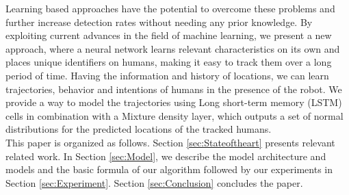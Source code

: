 Learning based approaches have the potential to overcome these problems and further increase detection rates without needing any prior knowledge.
By exploiting current advances in the field of machine learning, we present a new approach, where a neural network learns relevant characteristics on its own and places unique identifiers on humans, making it easy to track them over a long period of time.
Having the information and history of locations, we can learn trajectories, behavior and intentions of humans in the presence of the robot. 
We provide a way to model the trajectories using Long short-term memory (LSTM) cells in combination with a Mixture density layer, which outputs a set of normal distributions for the predicted locations of the tracked humans.\\
This paper is organized as follows.
Section \ref{sec:Stateoftheart} presents relevant related work.
In Section \ref{sec:Model}, we describe the model architecture and models and the basic formula of our algorithm followed by our experiments in Section \ref{sec:Experiment}.
Section \ref{sec:Conclusion} concludes the paper.

